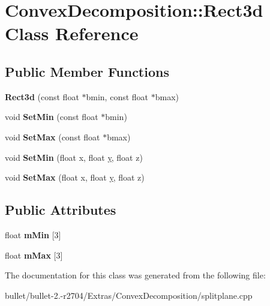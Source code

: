 \hypertarget{class_convex_decomposition_1_1_rect3d}{\section{Convex\+Decomposition\+:\+:Rect3d Class Reference}
\label{class_convex_decomposition_1_1_rect3d}
}
\subsection*{Public Member Functions}
\begin{DoxyCompactItemize}
\item 
\hypertarget{class_convex_decomposition_1_1_rect3d_aaa2682f55d6d00da82413bf2551d3c29}{{\bfseries Rect3d} (const float $\ast$bmin, const float $\ast$bmax)}\label{class_convex_decomposition_1_1_rect3d_aaa2682f55d6d00da82413bf2551d3c29}

\item 
\hypertarget{class_convex_decomposition_1_1_rect3d_a80da56485a54fac5923de4d343f454fb}{void {\bfseries Set\+Min} (const float $\ast$bmin)}\label{class_convex_decomposition_1_1_rect3d_a80da56485a54fac5923de4d343f454fb}

\item 
\hypertarget{class_convex_decomposition_1_1_rect3d_ab595e8ca8da0fab6af06e95e97982b25}{void {\bfseries Set\+Max} (const float $\ast$bmax)}\label{class_convex_decomposition_1_1_rect3d_ab595e8ca8da0fab6af06e95e97982b25}

\item 
\hypertarget{class_convex_decomposition_1_1_rect3d_adda7bd2a2b3ecb905cbc077afb631879}{void {\bfseries Set\+Min} (float x, float \hyperlink{_ice_utils_8h_aa7ffaed69623192258fb8679569ff9ba}{y}, float z)}\label{class_convex_decomposition_1_1_rect3d_adda7bd2a2b3ecb905cbc077afb631879}

\item 
\hypertarget{class_convex_decomposition_1_1_rect3d_af6cf0bcd543f02754ad8c36697db765c}{void {\bfseries Set\+Max} (float x, float \hyperlink{_ice_utils_8h_aa7ffaed69623192258fb8679569ff9ba}{y}, float z)}\label{class_convex_decomposition_1_1_rect3d_af6cf0bcd543f02754ad8c36697db765c}

\end{DoxyCompactItemize}
\subsection*{Public Attributes}
\begin{DoxyCompactItemize}
\item 
\hypertarget{class_convex_decomposition_1_1_rect3d_aee55fae3aff616de0fab74ec1e8f72ff}{float {\bfseries m\+Min} \mbox{[}3\mbox{]}}\label{class_convex_decomposition_1_1_rect3d_aee55fae3aff616de0fab74ec1e8f72ff}

\item 
\hypertarget{class_convex_decomposition_1_1_rect3d_a5e16408cf64f506972c460b15ccba5b2}{float {\bfseries m\+Max} \mbox{[}3\mbox{]}}\label{class_convex_decomposition_1_1_rect3d_a5e16408cf64f506972c460b15ccba5b2}

\end{DoxyCompactItemize}


The documentation for this class was generated from the following file\+:\begin{DoxyCompactItemize}
\item 
bullet/bullet-\/2.-\/r2704/\+Extras/\+Convex\+Decomposition/splitplane.\+cpp\end{DoxyCompactItemize}
